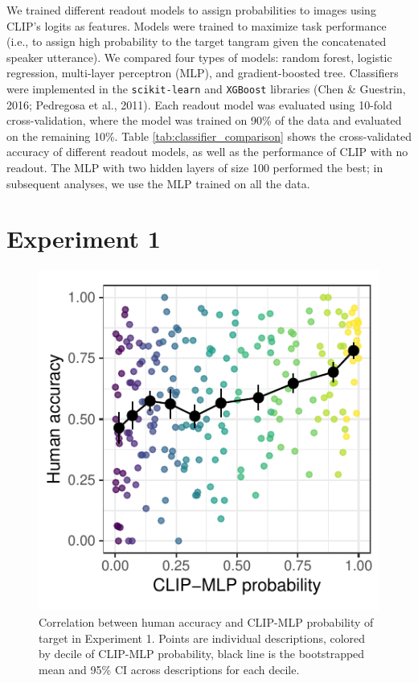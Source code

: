 \documentclass[10pt, letterpaper]{article}
\begin{document}
We trained different readout models to assign probabilities to images
using CLIP's logits as features. Models were trained to maximize task
performance (i.e., to assign high probability to the target tangram
given the concatenated speaker utterance). We compared four types of
models: random forest, logistic regression, multi-layer perceptron
(MLP), and gradient-boosted tree. Classifiers were implemented in the
\texttt{scikit-learn} and \texttt{XGBoost} libraries (Chen \& Guestrin,
2016; Pedregosa et al., 2011). Each readout model was evaluated using
10-fold cross-validation, where the model was trained on 90\% of the
data and evaluated on the remaining 10\%. Table
\ref{tab:classifier_comparison} shows the cross-validated accuracy of
different readout models, as well as the performance of CLIP with no
readout. The MLP with two hidden layers of size 100 performed the best;
in subsequent analyses, we use the MLP trained on all the data.

\section{Experiment 1}\label{experiment-1}

\begin{CodeChunk}
\begin{figure}[t]

{\centering \includegraphics[width=0.7\linewidth]{figs/fig-calibration-1} 

}

\caption[Correlation between human accuracy and CLIP-MLP probability of target in Experiment 1]{Correlation between human accuracy and CLIP-MLP probability of target in Experiment 1.  Points are individual descriptions, colored by decile of CLIP-MLP probability, black line is the bootstrapped mean and 95\% CI across descriptions for each decile. \label{calibration}}\label{fig:fig-calibration}
\end{figure}
\end{CodeChunk}
\end{document}
